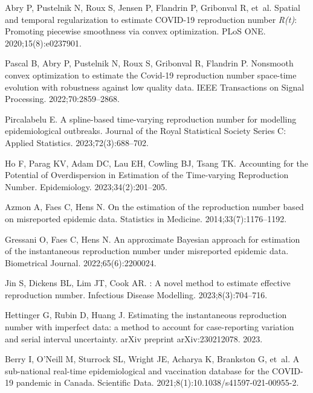 \documentclass[10pt,letterpaper]{article}
\begin{document}
\begin{thebibliography}{10}
  Abry P, Pustelnik N, Roux S, Jensen P, Flandrin P, Gribonval R, et~al.
  \newblock Spatial and temporal regularization to estimate {COVID-19}
    reproduction number \emph{R(t)}: Promoting piecewise smoothness via convex
    optimization.
  \newblock PLoS ONE. 2020;15(8):e0237901.
  
  Pascal B, Abry P, Pustelnik N, Roux S, Gribonval R, Flandrin P.
  \newblock Nonsmooth convex optimization to estimate the {C}ovid-19 reproduction
    number space-time evolution with robustness against low quality data.
  \newblock IEEE Transactions on Signal Processing. 2022;70:2859--2868.
  
  Pircalabelu E.
  \newblock A spline-based time-varying reproduction number for modelling
    epidemiological outbreaks.
  \newblock Journal of the Royal Statistical Society Series C: Applied
    Statistics. 2023;72(3):688--702.
  
  Ho F, Parag KV, Adam DC, Lau EH, Cowling BJ, Tsang TK.
  \newblock Accounting for the Potential of Overdispersion in Estimation of the
    Time-varying Reproduction Number.
  \newblock Epidemiology. 2023;34(2):201--205.
  
  Azmon A, Faes C, Hens N.
  \newblock On the estimation of the reproduction number based on misreported
    epidemic data.
  \newblock Statistics in Medicine. 2014;33(7):1176--1192.
  
  Gressani O, Faes C, Hens N.
  \newblock An approximate {B}ayesian approach for estimation of the
    instantaneous reproduction number under misreported epidemic data.
  \newblock Biometrical Journal. 2022;65(6):2200024.
  
  Jin S, Dickens BL, Lim JT, Cook AR.
  : A novel method to estimate effective reproduction number.
  \newblock Infectious Disease Modelling. 2023;8(3):704--716.
  
  Hettinger G, Rubin D, Huang J.
  \newblock Estimating the instantaneous reproduction number with imperfect data:
    a method to account for case-reporting variation and serial interval
    uncertainty.
  \newblock arXiv preprint arXiv:230212078. 2023.
  
  Berry I, O'Neill M, Sturrock SL, Wright JE, Acharya K, Brankston G, et~al.
  \newblock A sub-national real-time epidemiological and vaccination database for
    the {COVID}-19 pandemic in Canada.
  \newblock Scientific Data. 2021;8(1):{10.1038/s41597-021-00955-2}.
  

\end{thebibliography}
\end{document}
